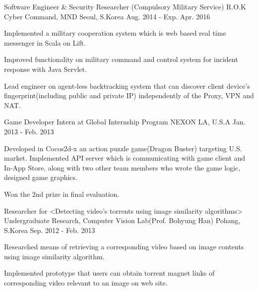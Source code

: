 


\begin{cventries}


\cventry
{Software Engineer \& Security Researcher (Compulsory Military Service)} %
{R.O.K Cyber Command, MND} %
{Seoul, S.Korea} %
{Aug. 2014 - Exp. Apr. 2016} %
{ %
\begin{cvitems}
\item {Implemented a military cooperation system which is web based real time messenger in Scala on Lift.}
\item {Improved functionality on military command and control system for incident response with Java Servlet.}
\item {Lead engineer on agent-less backtracking system that can discover client device's fingerprint(including public and private IP) independently of the Proxy, VPN and NAT.}
\end{cvitems}
}


\cventry
{Game Developer Intern at Global Internship Program} %
{NEXON} %
{LA, U.S.A} %
{Jan. 2013 - Feb. 2013} %
{ %
\begin{cvitems}
\item {Developed in Cocos2d-x an action puzzle game(Dragon Buster) targeting U.S. market. Implemented API server which is communicating with game client and In-App Store, along with two other team members who wrote the game logic, designed game graphics.}
\item {Won the 2nd prize in final evaluation.}
\end{cvitems}
}


\cventry
{Researcher for <Detecting video’s torrents using image similarity algorithms>} %
{Undergraduate Research, Computer Vision Lab(Prof. Bohyung Han)} %
{Pohang, S.Korea} %
{Sep. 2012 - Feb. 2013} %
{ %
\begin{cvitems}
\item {Researched means of retrieving a corresponding video based on image contents using image similarity algorithm.}
\item {Implemented prototype that users can obtain torrent magnet links of corresponding video relevant to an image on web site.}
\end{cvitems} 
}


\end{cventries}

